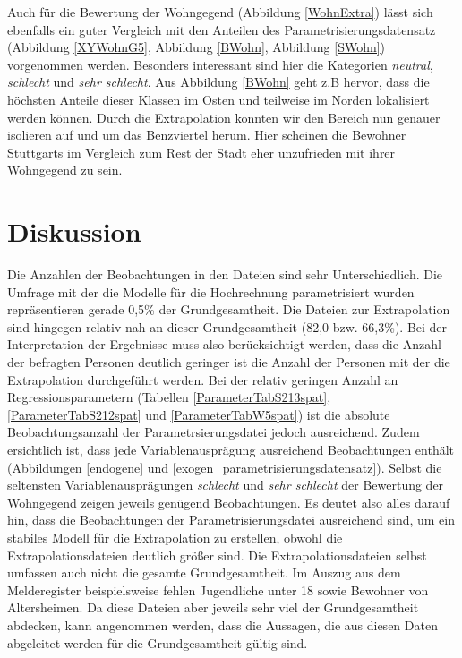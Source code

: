 \documentclass{Vorlage}
\begin{document}
Auch für die Bewertung der Wohngegend (Abbildung \ref{WohnExtra}) lässt sich ebenfalls ein guter Vergleich mit den Anteilen des Parametrisierungsdatensatz (Abbildung \ref{XYWohnG5}, Abbildung \ref{BWohn}, Abbildung \ref{SWohn}) vorgenommen werden. Besonders interessant sind hier die Kategorien \textit{neutral}, \textit{schlecht} und \textit{sehr schlecht}. Aus Abbildung \ref{BWohn} geht z.B hervor, dass die höchsten Anteile dieser Klassen im Osten und teilweise im Norden lokalisiert werden können. Durch die Extrapolation konnten wir den Bereich nun genauer isolieren auf und um das Benzviertel herum. Hier scheinen die Bewohner Stuttgarts im Vergleich zum Rest der Stadt eher unzufrieden mit ihrer Wohngegend zu sein.


\clearpage
\section{Diskussion}
Die Anzahlen der Beobachtungen in den Dateien sind sehr Unterschiedlich. Die Umfrage mit der die Modelle für die Hochrechnung parametrisiert wurden repräsentieren gerade 0,5\% der Grundgesamtheit. Die Dateien zur Extrapolation sind hingegen relativ nah an dieser Grundgesamtheit (82,0 bzw. 66,3\%). Bei der Interpretation der Ergebnisse muss also berücksichtigt werden, dass die Anzahl der befragten Personen deutlich geringer ist die Anzahl der Personen mit der die Extrapolation durchgeführt werden. Bei der relativ geringen Anzahl an Regressionsparametern (Tabellen \ref{ParameterTabS213spat}, \ref{ParameterTabS212spat} und \ref{ParameterTabW5spat}) ist die absolute Beobachtungsanzahl der Parametrsierungsdatei jedoch ausreichend. Zudem ersichtlich ist, dass jede Variablenausprägung ausreichend Beobachtungen enthält (Abbildungen \ref{endogene} und \ref{exogen_parametrisierungsdatensatz}). Selbst die seltensten Variablenausprägungen \textit{schlecht} und \textit{sehr schlecht} der Bewertung der Wohngegend zeigen jeweils genügend Beobachtungen. Es deutet also alles darauf hin, dass die Beobachtungen der Parametrisierungsdatei ausreichend sind, um ein stabiles Modell für die Extrapolation zu erstellen, obwohl die Extrapolationsdateien deutlich größer sind. Die Extrapolationsdateien selbst umfassen auch nicht die gesamte Grundgesamtheit. Im Auszug aus dem Melderegister beispielsweise fehlen Jugendliche unter 18 sowie Bewohner von Altersheimen. Da diese Dateien aber jeweils sehr viel der Grundgesamtheit abdecken, kann angenommen werden, dass die Aussagen, die aus diesen Daten abgeleitet werden für die Grundgesamtheit gültig sind.
\end{document}
